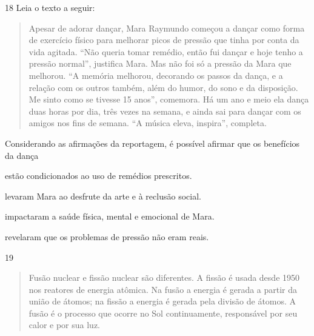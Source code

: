 \num{18}  Leia o texto a seguir:

\begin{quote}
Apesar de adorar dançar, Mara Raymundo começou a dançar como forma de
exercício físico para melhorar picos de pressão que tinha por conta da
vida agitada. ``Não queria tomar remédio, então fui dançar e hoje tenho a
pressão normal'', justifica Mara. Mas não foi só a pressão da Mara que
melhorou. ``A memória melhorou, decorando os passos da dança, e a relação
com os outros também, além do humor, do sono e da disposição. Me sinto
como se tivesse 15 anos'', comemora. Há um ano e meio ela dança duas
horas por dia, três vezes na semana, e ainda sai para dançar com os
amigos nos fins de semana. ``A música eleva, inspira'', completa.

\end{quote}

Considerando as afirmações da reportagem, é possível afirmar que os 
benefícios da dança  

\begin{escolha}
\item estão condicionados ao uso de remédios prescritos.

\item levaram Mara ao desfrute da arte e à reclusão social.

\item impactaram a saúde física, mental e emocional de Mara.

\item revelaram que os problemas de pressão não eram reais.
\end{escolha}


\num{19}
\begin{quote}
  Fusão nuclear e fissão nuclear são diferentes. A fissão é usada desde 1950 nos reatores de energia
  atômica. Na fusão a energia é gerada a partir da união de átomos; na fissão a energia é gerada pela divisão de átomos. A fusão
  é o processo que ocorre no Sol continuamente, responsável por seu
  calor e por sua luz.

\end{quote}


